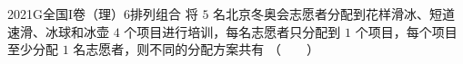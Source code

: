 
\begin{problem}{2021}{G}{全国I卷（理）}{6}{排列组合}
将 $ 5 $ 名北京冬奥会志愿者分配到花样滑冰、短道速滑、冰球和冰壶 $ 4 $ 个项目进行培训，每名志愿者只分配到 $ 1 $ 个项目，每个项目至少分配 $ 1 $ 名志愿者，则不同的分配方案共有 \hspace{1cm}（　　）
\begin{choices}
\end{choices}
\end{problem}

\begin{answer}

\end{answer}

\begin{solutions}

\end{solutions}